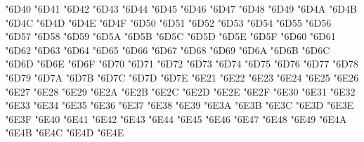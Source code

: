 {\Uchar\jis"6D40 %
\Uchar\jis"6D41 %
\Uchar\jis"6D42 %
\Uchar\jis"6D43 %
\Uchar\jis"6D44 %
\Uchar\jis"6D45 %
\Uchar\jis"6D46 %
\Uchar\jis"6D47 %
\Uchar\jis"6D48 %
\Uchar\jis"6D49 %
\Uchar\jis"6D4A %
\Uchar\jis"6D4B %
\Uchar\jis"6D4C %
\Uchar\jis"6D4D %
\Uchar\jis"6D4E %
\Uchar\jis"6D4F %
\Uchar\jis"6D50 %
\Uchar\jis"6D51 %
\Uchar\jis"6D52 %
\Uchar\jis"6D53 %
\Uchar\jis"6D54 %
\Uchar\jis"6D55 %
\Uchar\jis"6D56 %
\Uchar\jis"6D57 %
\Uchar\jis"6D58 %
\Uchar\jis"6D59 %
\Uchar\jis"6D5A %
\Uchar\jis"6D5B %
\Uchar\jis"6D5C %
\Uchar\jis"6D5D %
\Uchar\jis"6D5E %
\Uchar\jis"6D5F %
\Uchar\jis"6D60 %
\Uchar\jis"6D61 %
\Uchar\jis"6D62 %
\Uchar\jis"6D63 %
\Uchar\jis"6D64 %
\Uchar\jis"6D65 %
\Uchar\jis"6D66 %
\Uchar\jis"6D67 %
\Uchar\jis"6D68 %
\Uchar\jis"6D69 %
\Uchar\jis"6D6A %
\Uchar\jis"6D6B %
\Uchar\jis"6D6C %
\Uchar\jis"6D6D %
\Uchar\jis"6D6E %
\Uchar\jis"6D6F %
\Uchar\jis"6D70 %
\Uchar\jis"6D71 %
\Uchar\jis"6D72 %
\Uchar\jis"6D73 %
\Uchar\jis"6D74 %
\Uchar\jis"6D75 %
\Uchar\jis"6D76 %
\Uchar\jis"6D77 %
\Uchar\jis"6D78 %
\Uchar\jis"6D79 %
\Uchar\jis"6D7A %
\Uchar\jis"6D7B %
\Uchar\jis"6D7C %
\Uchar\jis"6D7D %
\Uchar\jis"6D7E %
\Uchar\jis"6E21 %
\Uchar\jis"6E22 %
\Uchar\jis"6E23 %
\Uchar\jis"6E24 %
\Uchar\jis"6E25 %
\Uchar\jis"6E26 %
\Uchar\jis"6E27 %
\Uchar\jis"6E28 %
\Uchar\jis"6E29 %
\Uchar\jis"6E2A %
\Uchar\jis"6E2B %
\Uchar\jis"6E2C %
\Uchar\jis"6E2D %
\Uchar\jis"6E2E %
\Uchar\jis"6E2F %
\Uchar\jis"6E30 %
\Uchar\jis"6E31 %
\Uchar\jis"6E32 %
\Uchar\jis"6E33 %
\Uchar\jis"6E34 %
\Uchar\jis"6E35 %
\Uchar\jis"6E36 %
\Uchar\jis"6E37 %
\Uchar\jis"6E38 %
\Uchar\jis"6E39 %
\Uchar\jis"6E3A %
\Uchar\jis"6E3B %
\Uchar\jis"6E3C %
\Uchar\jis"6E3D %
\Uchar\jis"6E3E %
\Uchar\jis"6E3F %
\Uchar\jis"6E40 %
\Uchar\jis"6E41 %
\Uchar\jis"6E42 %
\Uchar\jis"6E43 %
\Uchar\jis"6E44 %
\Uchar\jis"6E45 %
\Uchar\jis"6E46 %
\Uchar\jis"6E47 %
\Uchar\jis"6E48 %
\Uchar\jis"6E49 %
\Uchar\jis"6E4A %
\Uchar\jis"6E4B %
\Uchar\jis"6E4C %
\Uchar\jis"6E4D %
\Uchar\jis"6E4E %
}
